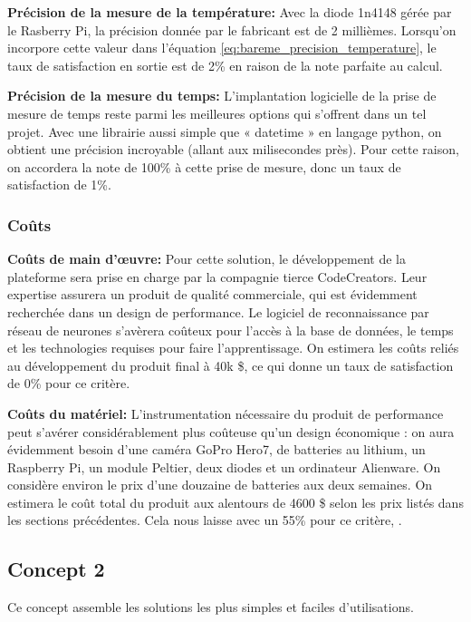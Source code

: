 \textbf{Précision de la mesure de la température:} Avec la diode 1n4148 gérée par le Rasberry Pi, la précision donnée par le fabricant est de 2 millièmes. Lorsqu'on incorpore cette valeur dans l'équation \ref{eq:bareme_precision_temperature}, le taux de satisfaction en sortie est de 2\% en raison de la note parfaite au calcul.
\vspace{5mm}

\textbf{Précision de la mesure du temps:}
L’implantation logicielle de la prise de mesure de temps reste parmi les meilleures options qui s’offrent dans un tel projet. Avec une librairie aussi simple que « datetime » en langage python, on obtient une précision incroyable (allant aux milisecondes près). Pour cette raison, on accordera la note de 100\% à cette prise de mesure, donc un taux de satisfaction de 1\%.

\subsubsection{Coûts}

\textbf{Coûts de main d’œuvre:}
Pour cette solution, le développement de la plateforme sera prise en charge par la compagnie tierce CodeCreators. Leur expertise assurera un produit de qualité commerciale, qui est évidemment recherchée dans un design de performance. Le logiciel de reconnaissance par réseau de neurones s'avèrera coûteux pour l'accès à la base de données, le temps  et les technologies requises pour faire l'apprentissage. On estimera les coûts reliés au développement du produit final à 40k \$, ce qui donne un taux de satisfaction de 0\% pour ce critère.
\vspace{5mm}

\textbf{Coûts du matériel:}
L’instrumentation nécessaire du produit de performance peut s’avérer considérablement plus coûteuse qu'un design économique : on aura évidemment besoin d’une caméra GoPro Hero7, de batteries au lithium, un Raspberry Pi, un module Peltier, deux diodes et un ordinateur Alienware. On considère environ le prix d'une douzaine de batteries aux deux semaines. On estimera le coût total du produit aux alentours de 4600 \$ selon les prix listés dans les sections précédentes. Cela nous laisse avec un 55\% pour ce critère, . 




\subsection{Concept 2}
Ce concept assemble les solutions les plus simples et faciles d'utilisations.

